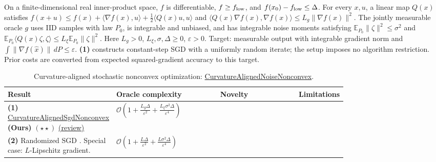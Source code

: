 \begin{table}[tp]
\centering
\caption{Curvature-aligned stochastic nonconvex optimization: \href{https://github.com/k3nfalt/longtails/blob/main/LongTails/Setups/CurvatureAlignedNoiseNonconvex.lean}{CurvatureAlignedNoiseNonconvex}.}\label{tab:CurvatureAlignedNoiseNonconvex}
\parbox{\linewidth}{\footnotesize On a finite-dimensional real inner-product space, $f$ is differentiable, $f\geq f_{\rm low}$, and $f(x_0)-f_{\rm low}\leq\Delta$. For every $x,u$, a linear map $Q(x)$ satisfies $f(x+u)\leq f(x)+\langle\nabla f(x),u\rangle+\frac12\langle Q(x)u,u\rangle$ and $\langle Q(x)\nabla f(x),\nabla f(x)\rangle\leq L_g\|\nabla f(x)\|^2$. The jointly measurable oracle $g$ uses IID samples with law $P_0$, is integrable and unbiased, and has integrable noise moments satisfying $\mathbb E_{P_0}\|\zeta\|^2\leq\sigma^2$ and $\mathbb E_{P_0}\langle Q(x)\zeta,\zeta\rangle\leq L_\xi\mathbb E_{P_0}\|\zeta\|^2$. Here $L_g>0$, $L_\xi,\sigma,\Delta\geq0$, $\varepsilon>0$. Target: measurable output with integrable gradient norm and $\int\|\nabla f(\widehat x)\|\,dP\leq\varepsilon$. \textbf{(1)} constructs constant-step SGD with a uniformly random iterate; the setup imposes no algorithm restriction. Prior costs are converted from expected squared-gradient accuracy to this target.}\par\smallskip
\begin{threeparttable}
\footnotesize
\setlength{\tabcolsep}{4pt}\renewcommand{\arraystretch}{1.25}
\begin{tabularx}{\linewidth}{@{}>{\raggedright\arraybackslash}p{0.20\linewidth}>{\raggedright\arraybackslash}p{0.32\linewidth}>{\raggedright\arraybackslash}p{0.25\linewidth}>{\raggedright\arraybackslash}X@{}}
\toprule
\textbf{Result} & \textbf{Oracle complexity} & \textbf{Novelty} & \textbf{Limitations} \\
\midrule
\textbf{(1)} \href{https://github.com/k3nfalt/longtails/blob/main/LongTails/Theorems/CurvatureAlignedSgdNonconvex.lean}{Curvature\allowbreak Aligned\allowbreak Sgd\allowbreak Nonconvex} \textbf{(Ours)} $(\star\star)$ \href{https://github.com/k3nfalt/longtails/blob/main/scripts/reviews/CurvatureAlignedSgdNonconvex.md}{(review)}
& $\mathcal{O}\!\left(1+\frac{L_g\Delta}{\varepsilon^2}+\frac{L_\xi\sigma^2\Delta}{\varepsilon^4}\right)$ & & \\
\midrule[1.2pt]
\textbf{(2)} Randomized SGD \citep[Cor.~2.2]{canGhadimiLan2013}. Special case: $L$-Lipschitz gradient.
& $\mathcal{O}\!\left(1+\frac{L\Delta}{\varepsilon^2}+\frac{L\sigma^2\Delta}{\varepsilon^4}\right)$

\end{tabularx}
\end{threeparttable}
\end{table}
